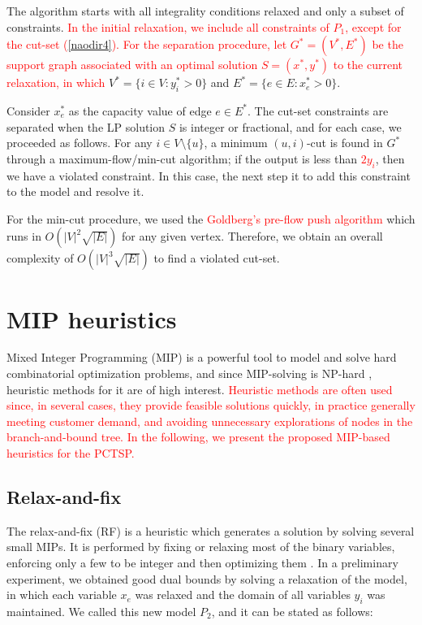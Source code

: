 \documentclass{ro}
\begin{document}
The algorithm starts with all integrality conditions relaxed and only a subset of constraints. \textcolor{red}{In the initial relaxation, we include all constraints of $P_1$, except for the cut-set (\ref{naodir4}). For the separation procedure, let $G^*=(V^*,E^*)$ be the support graph associated with an optimal solution $S=(x^*,y^*)$ to the current relaxation, in which} $V^* = \{i \in V : y_i^* > 0\}$ and $E^* = \{e \in E : x_e^* >0 \}$. 

Consider  $x_e^*$ as the capacity value of edge $e \in E^*$.
The cut-set constraints are separated when the LP solution $S$ is integer or fractional, and for each case, we proceeded as follows. For any $i \in V \setminus \{u\}$, a minimum $(u,i)$-cut is found in $G^*$ through a maximum-flow/min-cut algorithm; if the output is less than \textcolor{red}{$2y_i$}, then we have a violated constraint. In this case, the next step it to add this constraint to the model and resolve it.

For the min-cut procedure, we used the \textcolor{red}{Goldberg's pre-flow push algorithm} \cite{ciupala2008preflow} which runs in $O(|V|^2\sqrt{|E|})$ for any given vertex. Therefore, we obtain an overall complexity of $O(|V|^3\sqrt{|E|})$   to find a violated cut-set.


\section{MIP heuristics}
\label{sec:mip}
Mixed Integer Programming (MIP) is a powerful tool to model and solve hard combinatorial optimization problems, and since MIP-solving is NP-hard \cite{wolsey2014integer}, heuristic methods for it are of high interest. \textcolor{red}{Heuristic methods are often used since, in several cases, they provide feasible solutions quickly, in practice generally meeting customer demand, and avoiding unnecessary explorations of nodes in the branch-and-bound tree. In the following, we present the proposed MIP-based heuristics for the PCTSP.}

\subsection{Relax-and-fix}

The relax-and-fix (RF) is a  heuristic  which  generates  a  solution  by  solving  several small MIPs. It is performed by fixing or relaxing most of the binary variables, enforcing only a few to be integer and then optimizing them \cite{toledo2015relax}. In a preliminary experiment, we obtained good dual bounds by solving a relaxation of the model, in which each variable $x_e$  was relaxed and the domain of all  variables $y_i$ was maintained. We called this new model $P_2$, and it can be stated as follows:
\end{document}
